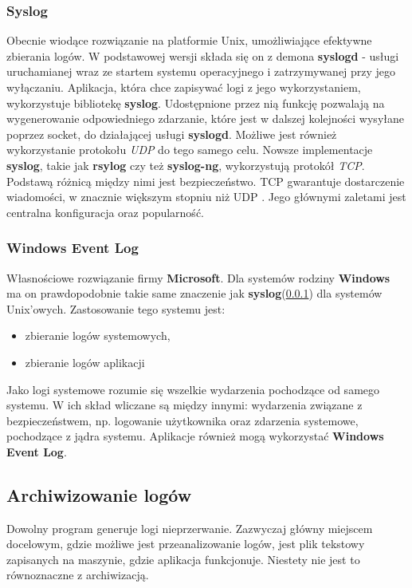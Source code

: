         \subsubsection{Syslog}
        \label{logs:collecting:source:syslog}
        Obecnie wiodące rozwiązanie na platformie Unix, umożliwiające efektywne zbierania logów. 
        W podstawowej wersji składa się on z demona \textbf{syslogd} - usługi
        uruchamianej wraz ze startem systemu operacyjnego i zatrzymywanej przy jego wyłączaniu. 
        Aplikacja, która chce zapisywać logi z jego wykorzystaniem, wykorzystuje bibliotekę \textbf{syslog}.
        Udostępnione przez nią funkcję pozwalają na wygenerowanie odpowiedniego zdarzanie, które jest
        w dalszej kolejności wysyłane poprzez socket, do działającej usługi \textbf{syslogd}. Możliwe jest
        również wykorzystanie protokołu \textit{UDP} do tego samego celu.
        Nowsze implementacje \textbf{syslog}, takie jak \textbf{rsylog} czy też \textbf{syslog-ng}, 
        wykorzystują protokół \textit{TCP}. Podstawą różnicą między nimi jest bezpieczeństwo. TCP
        gwarantuje dostarczenie wiadomości, w znacznie większym stopniu niż UDP \cite{logging_log_management}.
        Jego głównymi zaletami jest centralna konfiguracja oraz popularność.
        
        \subsubsection{Windows Event Log}
        \label{logs:collecting:source:windows_event_log}
        Własnościowe rozwiązanie firmy \textbf{Microsoft}. Dla systemów rodziny \textbf{Windows}
        ma on prawdopodobnie takie same znaczenie jak \textbf{syslog}(\ref{logs:collecting:source:syslog})
        dla systemów Unix'owych. Zastosowanie tego systemu jest:
        \begin{itemize}
            \item zbieranie logów systemowych,
            \item zbieranie logów aplikacji
        \end{itemize}
        Jako logi systemowe rozumie się wszelkie wydarzenia pochodzące od samego systemu. W ich skład
        wliczane są między innymi: wydarzenia związane z bezpieczeństwem, np. 
        logowanie użytkownika oraz zdarzenia systemowe, pochodzące z jądra systemu. Aplikacje
        również mogą wykorzystać \textbf{Windows Event Log}.
    
    \subsection{Archiwizowanie logów}
    Dowolny program generuje logi nieprzerwanie. Zazwyczaj główny miejscem docelowym, gdzie możliwe jest
    przeanalizowanie logów, jest plik tekstowy zapisanych na maszynie, gdzie aplikacja funkcjonuje.
    Niestety nie jest to równoznaczne z archiwizacją.
    
